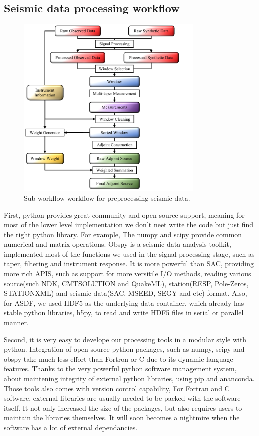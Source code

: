 \subsection{Seismic data processing workflow}
\begin{figure}
  \centering
  \includegraphics[width=0.8\textwidth]{ch-GLADM25/figures/Preprocess_workflow.pdf}
  \caption[Sub-workflow workflow for preprocessing seismic data]
  {\small{Sub-workflow workflow for preprocessing seismic data.}}
  \label{fig:preprocess_workflow}
\end{figure}

First, python provides great community and open-source support, meaning for most
of the lower level implementation we don't neet write the code but
just find the right python library. For example,
The numpy and scipy provide common numerical and matrix operations.
Obspy is a seismic data analysis toolkit, implemented
most of the functions we used in the signal processing stage, such as taper, filtering
and instrument response. It is more powerful than SAC,
providing more rich APIS, such as support for more versitile I/O methods, reading
various source(such NDK, CMTSOLUTION and QuakeML), station(RESP, Pole-Zeros, STATIONXML)
and seismic data(SAC, MSEED, SEGY and etc) format.
Also, for ASDF, we used HDF5 as the underlying data container, which already has
stable python libraries, h5py, to read and write HDF5 files in serial or parallel manner.

Second, it is very easy to develope our processing tools in a modular style with python.
Integration of open-source python packages, such as numpy, scipy and obspy take much
less effort than Fortron or C due to its dynamic language features.
Thanks to the very powerful python software management system,
about maintening integrity of external python libraries, using pip and ananconda.
Those tools also comes with version control capability,
For Fortran and C software, external libraries
are usually needed to be packed with the software itself. It not only increased the size
of the packages, but also requires users to maintain the libraries themselves. It will
 soon becomes a nightmire when the software has a lot of external dependancies.

